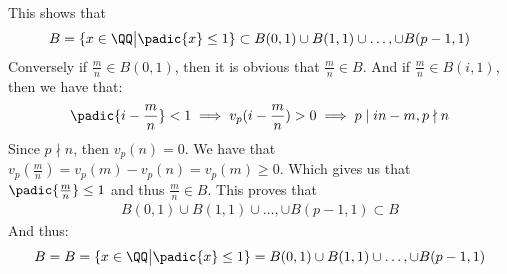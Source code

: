 \begin{enumerate}[label=\ilabel]
        This shows that
        \begin{gather*}
            B = \{x \in \QQ \big| \padic{x} \le 1 \} \subset B(0, 1) \cup B(1, 1) \cup \dots, \cup B(p - 1, 1) 
        \end{gather*}
        Conversely if $\frac{m}{n} \in B(0, 1)$, then it is obvious that $\frac{m}{n} \in B$. And if $\frac{m}{n} \in B(i, 1)$, then we have that:
        \begin{gather*}
            \padic{i - \frac{m}{n}} < 1 \implies v_p(i - \frac{m}{n}) > 0 \implies p \mid in - m ,  p \nmid n
        \end{gather*}
        Since $p \nmid n$, then $v_p(n) = 0$. We have that $v_p(\frac{m}{n}) = v_p(m) - v_p(n) = v_p(m) \ge 0$. Which gives us that $\padic{\frac{m}{n}} \le 1$ and thus $\frac{m}{n} \in B$. This proves that 
        \begin{gather*}
            B(0, 1) \cup B(1, 1) \cup \dots, \cup B(p - 1, 1) \subset B
        \end{gather*}
        And thus:
        \begin{gather*}
            B =  B = \{x \in \QQ \big| \padic{x} \le 1 \} = B(0, 1) \cup B(1, 1) \cup \dots, \cup B(p - 1, 1) 
        \end{gather*}
\end{enumerate}